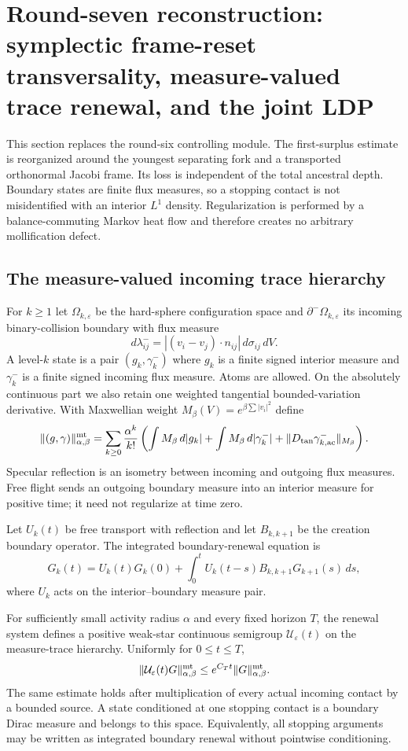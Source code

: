 \section{Round-seven reconstruction: symplectic frame-reset transversality, measure-valued trace renewal, and the joint LDP}
\label{sec:r7-b2}

This section replaces the round-six controlling module.  The first-surplus
estimate is reorganized around the youngest separating fork and a transported
orthonormal Jacobi frame.  Its loss is independent of the total ancestral
depth.  Boundary states are finite flux measures, so a stopping contact is not
misidentified with an interior $L^1$ density.  Regularization is performed by
a balance-commuting Markov heat flow and therefore creates no arbitrary
mollification defect.

\subsection{The measure-valued incoming trace hierarchy}

For $k\ge1$ let $\Omega_{k,\varepsilon}$ be the hard-sphere configuration
space and $\partial^-\Omega_{k,\varepsilon}$ its incoming binary-collision
boundary with flux measure
\[
 d\lambda^-_{ij}=| (v_i-v_j)\cdot n_{ij}|\,d\sigma_{ij}\,dV.
\]
A level-$k$ state is a pair $(g_k,\gamma_k^-)$ where $g_k$ is a finite signed
interior measure and $\gamma_k^-$ is a finite signed incoming flux measure.
Atoms are allowed.  On the absolutely continuous part we also retain one
weighted tangential bounded-variation derivative.  With Maxwellian weight
$M_\beta(V)=e^{\beta\sum|v_i|^2}$ define
\[
 \|(g,\gamma)\|_{\alpha,\beta}^{\rm mt}
 =\sum_{k\ge0}\frac{\alpha^k}{k!}
 \left(\int M_\beta\,d|g_k|
 +\int M_\beta\,d|\gamma_k^-|
 +\|D_{\mathrm{tan}}\gamma_{k,\mathrm{ac}}^-\|_{M_\beta}\right).
\]
Specular reflection is an isometry between incoming and outgoing flux
measures.  Free flight sends an outgoing boundary measure into an interior
measure for positive time; it need not regularize at time zero.

Let $U_k(t)$ be free transport with reflection and let $B_{k,k+1}$ be the
creation boundary operator.  The integrated boundary-renewal equation is
\[
 G_k(t)=U_k(t)G_k(0)
 +\int_0^tU_k(t-s)B_{k,k+1}G_{k+1}(s)\,ds,
\]
where $U_k$ acts on the interior--boundary measure pair.

\begin{theorem}
\label{thm:r7-b2-trace}
For sufficiently small activity radius $\alpha$ and every fixed horizon $T$,
the renewal system defines a positive weak-star continuous semigroup
$\mathcal U_\varepsilon(t)$ on the measure-trace hierarchy.  Uniformly for
$0\le t\le T$,
\[
 \|\mathcal U_\varepsilon(t)G\|_{\alpha,\beta}^{\rm mt}
 \le e^{C_Tt}\|G\|_{\alpha,\beta}^{\rm mt}.
\]
The same estimate holds after multiplication of every actual incoming contact
by a bounded source.  A state conditioned at one stopping contact is a boundary
Dirac measure and belongs to this space.  Equivalently, all stopping arguments
may be written as integrated boundary renewal without pointwise conditioning.
\end{theorem}

